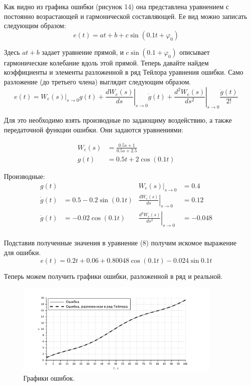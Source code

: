 \documentclass[a4paper, 11pt]{article}
\begin{document}
Как видно из графика ошибки (рисунок 14) она представлена уравнением с постоянно возрастающей и гармонической составляющей. Ее вид можно записать следующим образом: 
\begin{equation}
    e(t) = at + b + c\sin{(0.1t + \varphi_0)}
\end{equation}
\par
Здесь $at + b$ задает уравнение прямой, и $c\sin{(0.1 + \varphi_0)}$ описывает гармонические колебание вдоль этой прямой. Теперь давайте найдем коэффициенты и элементы разложенной в ряд Тейлора уравнения ошибки. Само разложение (до третьего члена) выглядит следующим образом. 
\begin{equation}
    e(t) = W_e(s)|_{s\rightarrow0}g(t) + \left.\frac{dW_e(s)}{ds}\right|_{s\rightarrow0}\dot{g}(t) + \left.\frac{d^2W_e(s)}{ds^2}\right|_{s\rightarrow0}\frac{\ddot{g}(t)}{2!}
\end{equation}

Для это необходимо взять производные по задающиму воздействию, а также передаточной функции ошибки. Они задаются уравнениями: 

\begin{align}
    W_{e}(s) & = \frac{0.5s + 1}{0.5s + 2.5} \\ 
    g(t) & = 0.5t + 2\cos{(0.1t)}
\end{align}
\par

Производные:
\begin{align*}
    g(t) & & W_e(s)|_{s\rightarrow0} & = 0.4 \\
    \dot{g}(t) & = 0.5 - 0.2\sin{(0.1t)} & \left.\frac{dW_e(s)}{ds}\right|_{s\rightarrow0} & = 0.12 \\
    \ddot{g}(t) & = -0.02\cos{(0.1t)} & \left.\frac{d^2W_e(s)}{ds^2}\right|_{s\rightarrow0} & = -0.048 \\
\end{align*}
\par

Подставив полученные значения в уравнение (8) получим искомое выражение для ошибки.
\begin{equation}
    e(t) = 0.2t + 0.06 + 0.80048\cos{(0.1t)} - 0.024\sin{0.1t}
\end{equation}
\par
Теперь можем получить графики ошибки, разложенной в ряд и реальной.
\begin{figure}[h!]
    \centering
    \includegraphics[width = 0.9\textwidth]{images/graph4withTailor.pdf}
    \caption{Графики ошибок.}
\end{figure}
\end{document}
